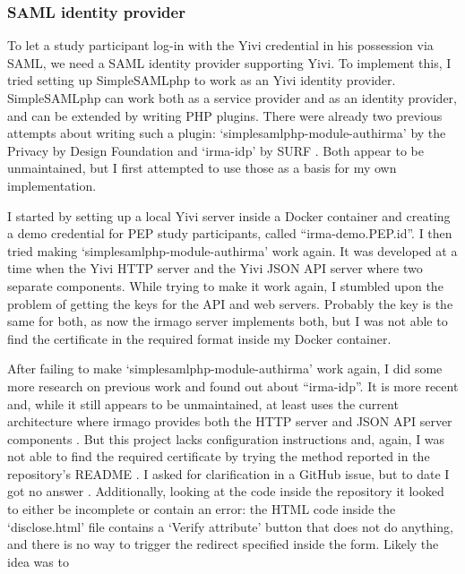 \documentclass{report}
\begin{document}
\subsubsection{SAML identity provider}
To let a study participant log-in with the Yivi credential in his possession via SAML, we need a SAML identity provider supporting Yivi. To implement this, I tried setting up
SimpleSAMLphp \cite{simplesamlphp} to work as an Yivi \cite{about-irma} identity provider. SimpleSAMLphp can work both as a service provider and as an identity provider, and can be
extended by writing PHP plugins. There were already two previous attempts about writing such a plugin: \enquote*{simplesamlphp-module-authirma} \cite{simplesamlphp-module-authirma}
by the Privacy by Design Foundation \cite{privacybydesignfoundation} and \enquote*{irma-idp} \cite{irma-idp} by SURF \cite{surf}.  Both appear to be unmaintained, but I first
attempted to use those as a basis for my own implementation. \par I started by setting up a local Yivi server inside a Docker container and creating a demo credential
\cite{irma-docs-issuer} for PEP study participants, called \enquote{irma-demo.PEP.id}. I then tried making \enquote*{simplesamlphp-module-authirma} work again. It was developed at
a time when the Yivi HTTP server and the Yivi JSON API server where two separate components. While trying to make it work again, I stumbled upon the problem of getting the keys for
the API and web servers. Probably the key is the same for both, as now the irmago server \cite{irma-docs-server} implements both, but I was not able to find the certificate in the
required format inside my Docker container. \par After failing to make \enquote*{simplesamlphp-module-authirma} work again, I did some more research on previous work and found out
about \enquote{irma-idp}. It is more recent and, while it still appears to be unmaintained, at least uses the current architecture where irmago provides both the HTTP server and
JSON API server components \cite{irma-docs-server}. But this project lacks configuration instructions and, again, I was not able to find the required certificate by trying the
method reported in the repository's README \cite{irma-idp}. I asked for clarification in a GitHub issue, but to date I got no answer \cite{irma-idp-issue}. Additionally, looking at
the code inside the repository it looked to either be incomplete or contain an error: the HTML code inside the \enquote*{disclose.html} file contains a \enquote*{Verify attribute}
button that does not do anything, and there is no way to trigger the redirect specified inside the form. Likely the idea was to
\end{document}
